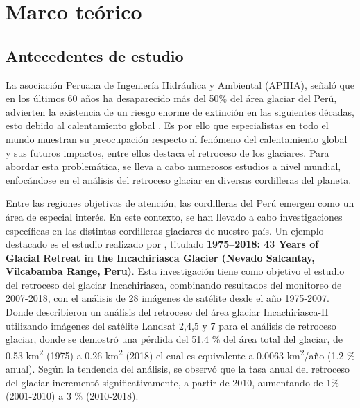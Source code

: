 \chapter{Marco teórico}
\doublespacing
\section{Antecedentes de estudio}

La asociación Peruana de Ingeniería Hidráulica y Ambiental (APIHA), señaló que en los últimos 60 años ha desaparecido más del 50{\%} del área glaciar del Perú, advierten la existencia de un riesgo enorme de extinción en las siguientes décadas, esto debido al calentamiento global \parencite{gerens}.  Es por ello que especialistas en todo el mundo muestran su preocupación respecto al fenómeno del calentamiento global y sus futuros impactos, entre ellos destaca el retroceso de los glaciares. Para abordar esta problemática, se lleva a cabo numerosos estudios a nivel mundial, enfocándose en el análisis del retroceso glaciar en diversas cordilleras del planeta.

Entre las regiones objetivas de atención, las cordilleras del Perú emergen como un área de especial interés. En este contexto, se han llevado a cabo investigaciones específicas en las distintas cordilleras glaciares de nuestro país. Un ejemplo destacado es el estudio realizado por \parencite{navarro20231975}, titulado \textbf{1975--2018: 43 Years of Glacial Retreat in the Incachiriasca Glacier (Nevado Salcantay, Vilcabamba Range, Peru)}. Esta investigación tiene como objetivo el estudio del retroceso del glaciar Incachiriasca, combinando resultados del monitoreo de  2007-2018, con el análisis de 28 imágenes de satélite desde el año 1975-2007. Donde describieron un análisis del retroceso del área glaciar Incachiriasca-II utilizando imágenes del satélite Landsat 2,4,5 y 7 para el análisis de retroceso glaciar, donde se demostró una pérdida del 51.4 {\%} del área total del glaciar, de 0.53 km\textsuperscript{2} (1975) a 0.26 km\textsuperscript{2} (2018) el cual es equivalente a 0.0063 km\textsuperscript{2}/año (1.2 {\%} anual). Según la tendencia del análisis, se observó que la tasa anual del retroceso del glaciar incrementó significativamente, a partir de 2010, aumentando de 1{\%} (2001-2010) a 3 {\%} (2010-2018).

